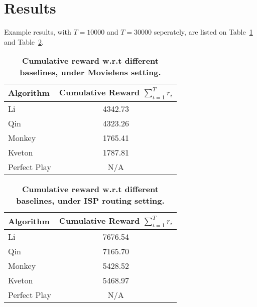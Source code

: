 \documentclass[a4paper,11pt]{article}
\begin{document}
\section{Results}

Example results, with $T=10000$ and $T=30000$ seperately, are listed on Table~\ref{movielens} and Table~\ref{isp}.

\begin{table}
    \centering
    \renewcommand{\arraystretch}{1.2}
	\begin{tabular}{lc}
	    \toprule
		\textbf{Algorithm}  &\textbf{Cumulative Reward $\sum_{t=1}^Tr_i $}\\
		\midrule
		Li		    &4342.73 \\
		Qin		    &4323.26 \\
		Monkey		    &1765.41 \\
		Kveton		    &1787.81 \\
		Perfect Play		    &N/A \\
		\bottomrule
	\end{tabular}
	\caption{\textbf{Cumulative reward w.r.t different baselines, under Movielens setting.}}
	\label{movielens}
\end{table}

\begin{table}
    \centering
    \renewcommand{\arraystretch}{1.2}
	\begin{tabular}{lc}
	    \toprule
		\textbf{Algorithm}  &\textbf{Cumulative Reward $\sum_{t=1}^Tr_i $}\\
		\midrule
		Li		    &7676.54 \\
		Qin		    &7165.70 \\
		Monkey		    &5428.52 \\
		Kveton		    &5468.97 \\
		Perfect Play		    &N/A \\
		\bottomrule
	\end{tabular}
	\caption{\textbf{Cumulative reward w.r.t different baselines, under ISP routing setting.}}
	\label{isp}
\end{table}
\end{document}
